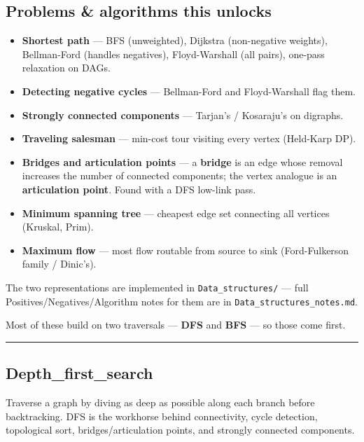 \documentclass[
  10pt,
  letterpaper,
  onecolumn]{article}
\providecommand{\tightlist}{%
  \setlength{\itemsep}{0pt}\setlength{\parskip}{0pt}}
\begin{document}
\hypertarget{problems-algorithms-this-unlocks}{%
\subsection{Problems \& algorithms this
unlocks}\label{problems-algorithms-this-unlocks}}

\begin{itemize}
\tightlist
\item
  \textbf{Shortest path} --- BFS (unweighted), Dijkstra (non-negative
  weights), Bellman-Ford (handles negatives), Floyd-Warshall (all
  pairs), one-pass relaxation on DAGs.
\item
  \textbf{Detecting negative cycles} --- Bellman-Ford and Floyd-Warshall
  flag them.
\item
  \textbf{Strongly connected components} --- Tarjan's / Kosaraju's on
  digraphs.
\item
  \textbf{Traveling salesman} --- min-cost tour visiting every vertex
  (Held-Karp DP).
\item
  \textbf{Bridges and articulation points} --- a \textbf{bridge} is an
  edge whose removal increases the number of connected components; the
  vertex analogue is an \textbf{articulation point}. Found with a DFS
  low-link pass.
\item
  \textbf{Minimum spanning tree} --- cheapest edge set connecting all
  vertices (Kruskal, Prim).
\item
  \textbf{Maximum flow} --- most flow routable from source to sink
  (Ford-Fulkerson family / Dinic's).
\end{itemize}

The two representations are implemented in \texttt{Data\_structures/}
--- full Positives/Negatives/Algorithm notes for them are in
\texttt{Data\_structures\_notes.md}.

Most of these build on two traversals --- \textbf{DFS} and \textbf{BFS}
--- so those come first.

\begin{center}\rule{0.5\linewidth}{0.5pt}\end{center}

\hypertarget{depth_first_search}{%
\subsection{Depth\_first\_search}\label{depth_first_search}}

Traverse a graph by diving as deep as possible along each branch before
backtracking. DFS is the workhorse behind connectivity, cycle detection,
topological sort, bridges/articulation points, and strongly connected
components.
\end{document}
